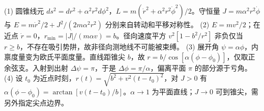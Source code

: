 (1) 圆锥线元 \(ds^2=dr^2+\alpha^2r^2d\phi^2\)，\(L=m(\dot r^2+\alpha^2r^2\dot\phi^2)/2\)。守恒量 \(J=m\alpha^2r^2\dot\phi\) 与 \(E=m\dot r^2/2+J^2/(2m\alpha^2r^2)\) 分别来自转动和平移对称性。
(2) \(E=mv^2/2\)；在近点 \(\dot r=0\)，\(r_{\min}=|J|/(m\alpha v)=b\)。径向速度平方 \(v^2[1-b^2/r^2]\) 非负仅当 \(r\ge b\)，不存在吸引势阱，故非径向测地线不可能被束缚。
(3) 展开角 \(\psi=\alpha\phi\)，内禀度量变为欧氏平面度量。直线距锥尖 \(b\)，故 \(r=b/\cos[\alpha(\phi-\phi_0)]\)，仅取正余弦支。入射到出射 \(\Delta\psi=\pi\)，于是 \(\Delta\phi=\pi/\alpha\)，偏离平面 \(\pi\) 的部分源于亏角。
(4) 设 \(t_0\) 为近点时刻，\(r(t)=\sqrt{b^2+v^2(t-t_0)^2}\)，对 \(J>0\) 有 \(\alpha(\phi-\phi_0)=\arctan[v(t-t_0)/b]\)。\(\alpha\to1\) 为平面直线；\(J\to0\) 可到锥尖，需另外指定尖点边界。

